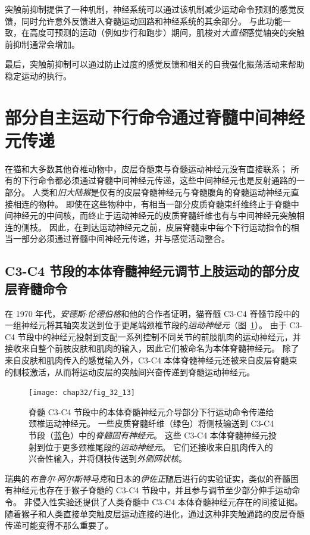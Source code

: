 突触前抑制提供了一种机制，神经系统可以通过该机制减少运动命令预测的感觉反馈，同时允许意外反馈进入脊髓运动回路和神经系统的其余部分。
与此功能一致，在高度可预测的运动（例如步行和跑步）期间，肌梭对\textit{大直径}感觉轴突的突触前抑制通常会增加。


最后，突触前抑制可以通过防止过度的感觉反馈和相关的自我强化振荡活动来帮助稳定运动的执行。



\section{部分自主运动下行命令通过脊髓中间神经元传递}

在猫和大多数其他脊椎动物中，皮层脊髓束与脊髓运动神经元没有直接联系；
所有的下行命令都必须通过脊髓中间神经元传递，这些中间神经元也是反射通路的一部分。
人类和\textit{旧大陆猴}是仅有的皮层脊髓神经元与脊髓腹角的脊髓运动神经元直接相连的物种。
即使在这些物种中，有相当一部分皮质脊髓束纤维终止于脊髓中间神经元的中间核，而终止于运动神经元的皮质脊髓纤维也有与中间神经元突触相连的侧枝。
因此，在到达运动神经元之前，皮层脊髓束中每个下行运动指令的相当一部分必须通过脊髓中间神经元传递，并与感觉活动整合。



\subsection{C3-C4 节段的本体脊髓神经元调节上肢运动的部分皮层脊髓命令}

在 1970 年代，\textit{安德斯$\cdot$伦德伯格}和他的合作者证明，猫脊髓 C3-C4 脊髓节段中的一组神经元将其轴突发送到位于更尾端颈椎节段的\textit{运动神经元}（图~\ref{fig:32_13}）。
由于 C3-C4 节段中的神经元投射到支配一系列控制不同关节的前肢肌肉的运动神经元，并接收来自整个前肢皮肤和肌肉的输入，因此它们被命名为本体脊髓神经元。
除了来自皮肤和肌肉传入的感觉输入外，C3-C4 本体脊髓神经元还被来自皮层脊髓束的侧枝激活，从而将运动皮层的突触间兴奋传递到脊髓运动神经元。


\begin{figure}[htbp]
	\centering
	\texttt{[image: chap32/fig\_32\_13]}
	\caption{脊髓 C3-C4 节段中的本体脊髓神经元介导部分下行运动命令传递给颈椎运动神经元。
		一些皮质脊髓纤维（绿色）将侧枝输送到 C3-C4 节段（蓝色）中的\textit{脊髓固有神经元}。
		这些 C3-C4 本体脊髓神经元投射到位于更多颈椎尾段的\textit{运动神经元}。
		它们还接收来自肌肉传入的兴奋性输入，并将侧枝传送到\textit{外侧网状核}。}
	\label{fig:32_13}
\end{figure}


瑞典的\textit{布鲁尔$\cdot$阿尔斯特马克}和日本的\textit{伊佐正}随后进行的实验证实，类似的脊髓固有神经元也存在于猴子脊髓的 C3-C4 节段中，并且参与调节至少部分伸手运动命令。
非侵入性实验还提供了人类脊髓中 C3-C4 本体脊髓神经元存在的间接证据。
随着猴子和人类直接单突触皮层运动连接的进化，通过这种非突触通路的皮层脊髓传递可能变得不那么重要了。


